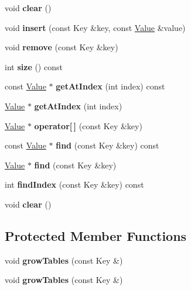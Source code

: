 \begin{DoxyCompactItemize}
void {\bfseries clear} ()
\item 
\mbox{\label{classbtHashMap_a15fc118df433a9b7f4350d42cd33bd13}} 
void {\bfseries insert} (const Key \&key, const \hyperlink{classValue}{Value} \&value)
\item 
\mbox{\label{classbtHashMap_aa42f8bdb95f77c52974d9998b41e0507}} 
void {\bfseries remove} (const Key \&key)
\item 
\mbox{\label{classbtHashMap_a48733b2de36eded2f5c845762aca2901}} 
int {\bfseries size} () const
\item 
\mbox{\label{classbtHashMap_aaf21fe2518b94d071fff58f4f2d8052d}} 
const \hyperlink{classValue}{Value} $\ast$ {\bfseries get\+At\+Index} (int index) const
\item 
\mbox{\label{classbtHashMap_a6a80cb0e97a1f5493877c78ceea058c2}} 
\hyperlink{classValue}{Value} $\ast$ {\bfseries get\+At\+Index} (int index)
\item 
\mbox{\label{classbtHashMap_af195fa3847a1159b3dc161f32fd09004}} 
\hyperlink{classValue}{Value} $\ast$ {\bfseries operator\mbox{[}$\,$\mbox{]}} (const Key \&key)
\item 
\mbox{\label{classbtHashMap_a5e13472314dfca4a427e1092d416c65e}} 
const \hyperlink{classValue}{Value} $\ast$ {\bfseries find} (const Key \&key) const
\item 
\mbox{\label{classbtHashMap_afe51e217996a94c176e59208b78ad90a}} 
\hyperlink{classValue}{Value} $\ast$ {\bfseries find} (const Key \&key)
\item 
\mbox{\label{classbtHashMap_a7c2015cfa4f25a86e48a7d34dfab72c5}} 
int {\bfseries find\+Index} (const Key \&key) const
\item 
\mbox{\label{classbtHashMap_a350c623ef89a0c7e8b542537f8d0c9f0}} 
void {\bfseries clear} ()
\end{DoxyCompactItemize}
\subsection*{Protected Member Functions}
\begin{DoxyCompactItemize}
\item 
\mbox{\label{classbtHashMap_a5e5a1d837970bcad57b8c9bd5af043a7}} 
void {\bfseries grow\+Tables} (const Key \&)
\item 
\mbox{\label{classbtHashMap_a5e5a1d837970bcad57b8c9bd5af043a7}} 
void {\bfseries grow\+Tables} (const Key \&)
\end{DoxyCompactItemize}
